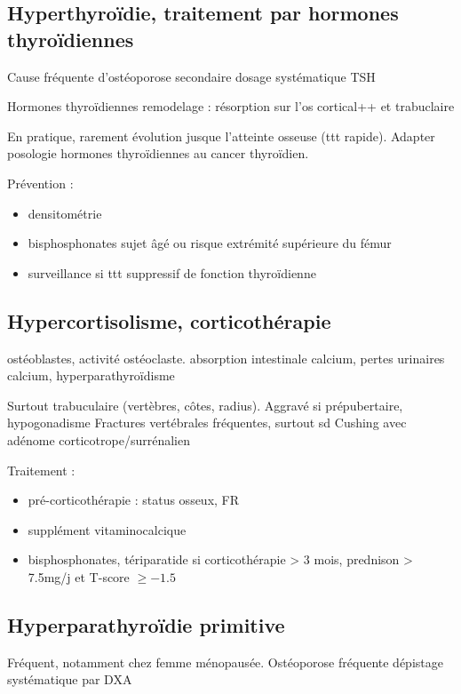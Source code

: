 \documentclass[11pt]{article}
\begin{document}
\subsection{Hyperthyroïdie, traitement par hormones thyroïdiennes}
\label{sec:org740a03b}
Cause fréquente d'ostéoporose secondaire \thus dosage systématique TSH

Hormones thyroïdiennes \inc remodelage : résorption sur l'os cortical++ et trabuclaire

En pratique, rarement évolution jusque l'atteinte osseuse (ttt
rapide). Adapter posologie hormones thyroïdiennes au cancer thyroïdien.

Prévention :
\begin{itemize}
\item densitométrie
\item bisphosphonates sujet âgé ou risque extrémité supérieure du fémur
\item surveillance si ttt suppressif de fonction thyroïdienne
\end{itemize}

\subsection{Hypercortisolisme, corticothérapie}
\label{sec:orgccd7119}

\dec ostéoblastes, \inc activité ostéoclaste. \dec absorption intestinale
calcium, \inc pertes urinaires calcium, hyperparathyroïdisme

Surtout trabuculaire (vertèbres, côtes, radius). Aggravé si prépubertaire, hypogonadisme
Fractures vertébrales fréquentes, surtout sd Cushing avec adénome
corticotrope/surrénalien

Traitement : 
\begin{itemize}
\item pré-corticothérapie : status osseux, FR
\item supplément vitaminocalcique
\item bisphosphonates, tériparatide si corticothérapie > 3 mois, prednison > 7.5mg/j
et T-score \(\ge -1.5\)
\end{itemize}

\subsection{Hyperparathyroïdie primitive}
\label{sec:org0b9e340}
Fréquent, notamment chez femme ménopausée. Ostéoporose fréquente \thus dépistage
systématique par DXA
\end{document}
